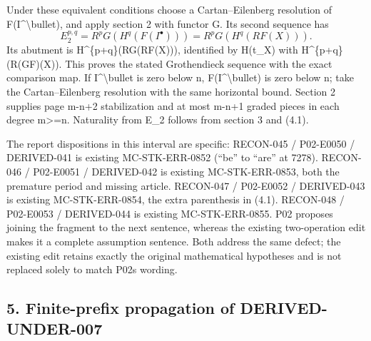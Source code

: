 \documentclass[11pt]{article}
\begin{document}
Under these equivalent conditions choose a Cartan–\allowbreak{}Eilenberg resolution of F(I\textasciicircum{}\textbackslash{}bullet)\allowbreak{},\allowbreak{} and apply section 2 with functor G. Its second sequence has \[
 E_2^{p,q}=R^pG(H^q(F(I^\bullet)))=R^pG(H^q(RF(X))).
                                                               \tag{4.2}
\] Its abutment is H\textasciicircum{}\{p\allowbreak{}+q\}(RG(RF(X)\allowbreak{})\allowbreak{})\allowbreak{},\allowbreak{} identified by H(t\_\allowbreak{}X)\allowbreak{} with H\textasciicircum{}\{p\allowbreak{}+q\}(R(GF)\allowbreak{}(X)\allowbreak{})\allowbreak{}. This proves the stated Grothendieck sequence with the exact comparison map. If I\^{}\textbackslash bullet is zero below n,\allowbreak{} F(I\textasciicircum{}\textbackslash{}bullet)\allowbreak{} is zero below n; take the Cartan–\allowbreak{}Eilenberg resolution with the same horizontal bound. Section 2 supplies page m-n\allowbreak{}+2 stabilization and at most m-n\allowbreak{}+1 graded pieces in each degree m>\allowbreak{}=n. Naturality from E\_\allowbreak{}2 follows from section 3 and (4.1)\allowbreak{}.

The report dispositions in this interval are specific:\allowbreak{} RECON-045 /\allowbreak{} P02-E0050 /\allowbreak{} DERIVED-041 is existing MC-STK-ERR-0852 (``be'' to ``are'' at 7278)\allowbreak{}. RECON-046 /\allowbreak{} P02-E0051 /\allowbreak{} DERIVED-042 is existing MC-STK-ERR-0853,\allowbreak{} both the premature period and missing article. RECON-047 /\allowbreak{} P02-E0052 /\allowbreak{} DERIVED-043 is existing MC-STK-ERR-0854,\allowbreak{} the extra parenthesis in (4.1)\allowbreak{}. RECON-048 /\allowbreak{} P02-E0053 /\allowbreak{} DERIVED-044 is existing MC-STK-ERR-0855. P02 proposes joining the fragment to the next sentence,\allowbreak{} whereas the existing two-operation edit makes it a complete assumption sentence. Both address the same defect; the existing edit retains exactly the original mathematical hypotheses and is not replaced solely to match P02\textquotesingle s wording.

\subsection{5. Finite-prefix propagation of DERIVED-UNDER-007}\label{proofs-7096-7578-finite-prefix-propagation-of-derived-under-007}
\end{document}
